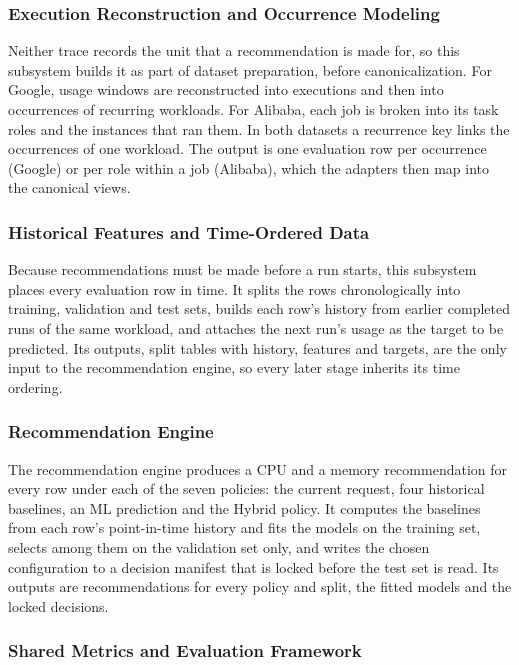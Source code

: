 \subsubsection{Execution Reconstruction and Occurrence Modeling}\label{sec:2.2.2}

Neither trace records the unit that a recommendation is made for, so this subsystem builds it as part of dataset preparation, before canonicalization. For Google, usage windows are reconstructed into executions and then into occurrences of recurring workloads. For Alibaba, each job is broken into its task roles and the instances that ran them. In both datasets a recurrence key links the occurrences of one workload. The output is one evaluation row per occurrence (Google) or per role within a job (Alibaba), which the adapters then map into the canonical views.

\subsubsection{Historical Features and Time-Ordered Data}\label{sec:2.2.3}

Because recommendations must be made before a run starts, this subsystem places every evaluation row in time. It splits the rows chronologically into training, validation and test sets, builds each row's history from earlier completed runs of the same workload, and attaches the next run's usage as the target to be predicted. Its outputs, split tables with history, features and targets, are the only input to the recommendation engine, so every later stage inherits its time ordering.

\subsubsection{Recommendation Engine}\label{sec:2.2.4}

The recommendation engine produces a CPU and a memory recommendation for every row under each of the seven policies: the current request, four historical baselines, an ML prediction and the Hybrid policy. It computes the baselines from each row's point-in-time history and fits the models on the training set, selects among them on the validation set only, and writes the chosen configuration to a decision manifest that is locked before the test set is read. Its outputs are recommendations for every policy and split, the fitted models and the locked decisions.

\subsubsection{Shared Metrics and Evaluation Framework}\label{sec:2.2.5}

